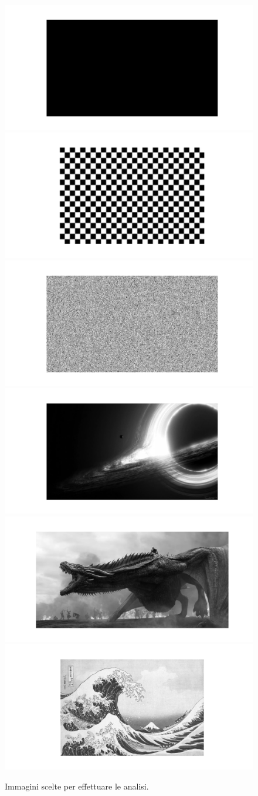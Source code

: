 \begin{figure}[h]
    \centering
    \includegraphics[width = .3\textwidth]{hw-1/report/imgs/black.png}
    \includegraphics[width = .3\textwidth]{hw-1/report/imgs/chessboard.png}
    \includegraphics[width = .3\textwidth]{hw-1/report/imgs/gaussian-noise.png}
    \includegraphics[width = .3\textwidth]{hw-1/report/imgs/interstellar.png}
    \includegraphics[width = .3\textwidth]{hw-1/report/imgs/dragon.png}
    \includegraphics[width = .3\textwidth]{hw-1/report/imgs/great-wave.png}
    \caption{Immagini scelte per effettuare le analisi. }
    \label{fig:all-figures-final}
\end{figure}




